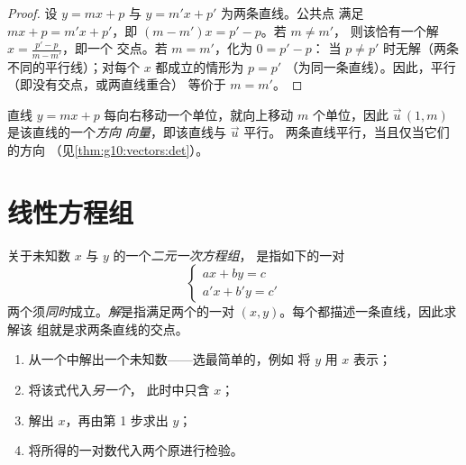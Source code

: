 \begin{proof}
设 $y = mx + p$ 与 $y = m'x + p'$ 为两条直线。公共点
满足 $mx + p = m'x + p'$，即 $(m - m')x = p' - p$。若 $m \neq m'$，
则该恰有一个解 $x = \frac{p' - p}{m - m'}$，即一个
交点。若 $m = m'$，化为 $0 = p' - p$：
当 $p \neq p'$ 时无解（两条不同的平行线）；对每个 $x$ 都成立的情形为 $p = p'$
（为同一条直线）。因此，平行（即没有交点，或两直线重合）
等价于 $m = m'$。
\end{proof}

\begin{remark}[方向向量]
直线 $y = mx + p$ 每向右移动一个单位，就向上移动 $m$ 个单位，因此
 $\vec u\,(1, m)$ 是该直线的一个\emph{方向
向量}，即该直线与 $\vec u$ 平行。
两条直线平行，当且仅当它们的方向
（见\cref{thm:g10:vectors:det}）。
\end{remark}

\section{线性方程组}

\begin{definition}[线性方程组]\label{def:g10:lines:system}
关于未知数 $x$ 与 $y$ 的一个\emph{二元一次方程组}，
是指如下的一对
\[
\begin{cases}
a x + b y = c \\
a' x + b' y = c'
\end{cases}
\]
两个须\emph{同时}成立。\emph{解}是指满足两个的一对
$(x, y)$。每个都描述一条直线，因此求解该
组就是求两条直线的交点。
\end{definition}

\begin{method}[代入法]\label{met:g10:lines:substitution}
\begin{enumerate}
  \item 从一个中解出一个未知数——选最简单的，例如
        将 $y$ 用 $x$ 表示；
  \item 将该式代入\emph{另一个}，
        此时中只含 $x$；
  \item 解出 $x$，再由第 1 步求出 $y$；
  \item 将所得的一对数代入两个原进行检验。
\end{enumerate}
\end{method}

